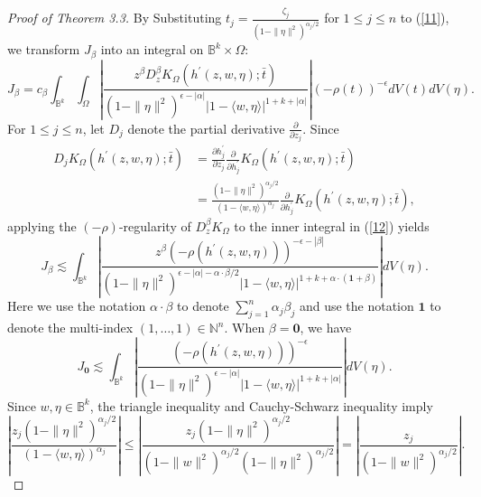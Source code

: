 \documentclass[reqno,12pt]{amsart}
\numberwithin{equation}{section}
\begin{document}
\begin{proof}[Proof of Theorem 3.3]
		 By Substituting $t_j=\frac{\zeta_j}{(1-\|\eta\|^2)^{\alpha_j/2}}$ for $1\leq j\leq n$ to (\ref{11}), we transform $J_\beta$ into an integral on $\mathbb B^k \times \Omega$:
			\begin{equation}\label{12}
			J_\beta=c_\beta\int_{\mathbb B^k}\int_{\Omega}\left|\frac{z^{\beta}{D^\beta_z} K_{\Omega}\left(h^{\prime}(z,w,\eta) ;\bar t \right)}{(1-\|\eta\|^2)^{\epsilon-|\alpha|}|1- \langle w,\eta\rangle |^{1+k+|\alpha|}}\right|\left(-\rho\left(t \right)\right)^{-\epsilon}dV(t )dV(\eta).
			\end{equation}
		For $1\leq j\leq n$, let $D_j$ denote the partial derivative $\frac{\partial}{\partial z_j}$.	Since 
			\begin{align}
			D_jK_{\Omega}\left(h^{\prime}(z,w,\eta) ;\bar t \right)&=\frac{\partial h^{\prime}_j}{\partial z_j}\frac{\partial}{\partial h^{\prime}_j}K_{\Omega}\left(h^{\prime}(z,w,\eta) ;\bar t \right)\nonumber\\&=\frac{(1-\|\eta\|^2)^{\alpha_j/2}}{(1-\langle w,\eta\rangle)^{\alpha_j}}\frac{\partial}{\partial h^{\prime}_j}K_{\Omega}\left(h^{\prime}(z,w,\eta) ;\bar t \right),
			\end{align}
			applying the $(-\rho)$-regularity of ${D^{\beta}_z}K_\Omega$ to the inner integral in (\ref{12}) yields
			\begin{equation}\label{13}
			J_\beta\lesssim \int_{\mathbb B^k}\left|\frac{z^{\beta}\left(-\rho\left(h^{\prime}(z,w,\eta) \right)\right)^{-\epsilon-|\beta|}}{(1-\|\eta\|^2)^{\epsilon-|\alpha|-\alpha\cdot\beta/2}|1- \langle w,\eta\rangle |^{1+k+\alpha\cdot(\mathbf 1+\beta)}}\right|dV(\eta).
			\end{equation}
			Here we use the notation $\alpha\cdot\beta$ to denote $\sum_{j=1}^{n}\alpha_j\beta_j$ and use the notation $\mathbf 1$ to denote the multi-index $(1,\dots,1)\in \mathbb N^n$.
			When $\beta=\mathbf 0$, we have 
			\begin{equation}\label{131}
			J_\mathbf 0\lesssim \int_{\mathbb B^k}\left|\frac{\left(-\rho\left(h^{\prime}(z,w,\eta) \right)\right)^{-\epsilon}}{(1-\|\eta\|^2)^{\epsilon-|\alpha|}|1- \langle w,\eta\rangle |^{1+k+|\alpha|}}\right|dV(\eta).
			\end{equation}
			{Since $w,\eta\in \mathbb B^k$,} the triangle inequality and Cauchy-Schwarz inequality {imply}
			$$\left|\frac{z_j(1-\|\eta\|^2)^{\alpha_j/2}}{(1-\langle w,{\eta}\rangle)^{\alpha_j}}\right|\leq\left|\frac{z_j(1-\|\eta\|^2)^{\alpha_j/2}}{(1-\|w\|^2)^{\alpha_j/2}(1-\|\eta\|^2)^{\alpha_j/2}}\right|=\left|\frac{z_j}{(1-\|w\|^2)^{\alpha_j/2}}\right|.$$

\end{proof}
\end{document}
